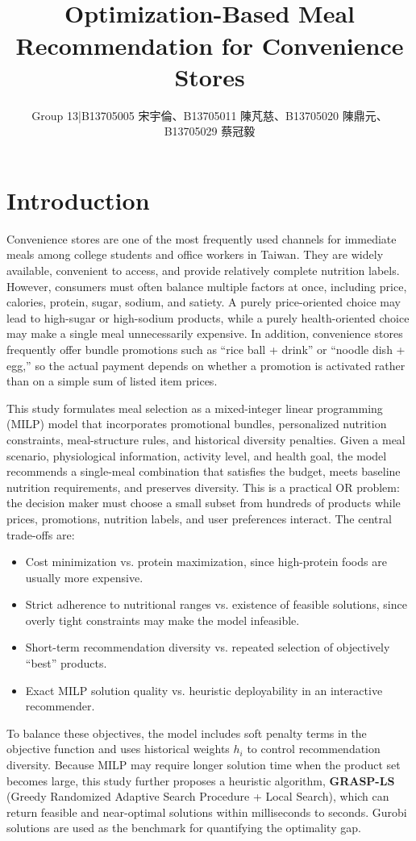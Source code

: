 \documentclass[a4paper]{article}
\title{\vspace{-1.2cm}{\fontsize{14}{17}\selectfont\bfseries 114-2 Operations Research Final Project}\\[8pt]
{\fontsize{16}{19}\selectfont\bfseries Optimization-Based Meal Recommendation for Convenience Stores}}
\author{\fontsize{10}{13}\selectfont Group 13\;|\;B13705005 宋宇倫、B13705011 陳芃慈、B13705020 陳鼎元、B13705029 蔡冠毅}
\date{}
\begin{document}
\maketitle
\vspace{-0.5cm}

\section{Introduction}
Convenience stores are one of the most frequently used channels for immediate meals among college students and office workers in Taiwan. They are widely available, convenient to access, and provide relatively complete nutrition labels. However, consumers must often balance multiple factors at once, including price, calories, protein, sugar, sodium, and satiety. A purely price-oriented choice may lead to high-sugar or high-sodium products, while a purely health-oriented choice may make a single meal unnecessarily expensive. In addition, convenience stores frequently offer bundle promotions such as ``rice ball + drink'' or ``noodle dish + egg,'' so the actual payment depends on whether a promotion is activated rather than on a simple sum of listed item prices.

This study formulates meal selection as a mixed-integer linear programming (MILP) model that incorporates promotional bundles, personalized nutrition constraints, meal-structure rules, and historical diversity penalties. Given a meal scenario, physiological information, activity level, and health goal, the model recommends a single-meal combination that satisfies the budget, meets baseline nutrition requirements, and preserves diversity. This is a practical OR problem: the decision maker must choose a small subset from hundreds of products while prices, promotions, nutrition labels, and user preferences interact. The central trade-offs are:
\begin{itemize}
\item Cost minimization vs. protein maximization, since high-protein foods are usually more expensive.
\item Strict adherence to nutritional ranges vs. existence of feasible solutions, since overly tight constraints may make the model infeasible.
\item Short-term recommendation diversity vs. repeated selection of objectively ``best'' products.
\item Exact MILP solution quality vs. heuristic deployability in an interactive recommender.
\end{itemize}
To balance these objectives, the model includes soft penalty terms in the objective function and uses historical weights $h_i$ to control recommendation diversity. Because MILP may require longer solution time when the product set becomes large, this study further proposes a heuristic algorithm, \textbf{GRASP-LS} (Greedy Randomized Adaptive Search Procedure + Local Search), which can return feasible and near-optimal solutions within milliseconds to seconds. Gurobi solutions are used as the benchmark for quantifying the optimality gap.
\end{document}
